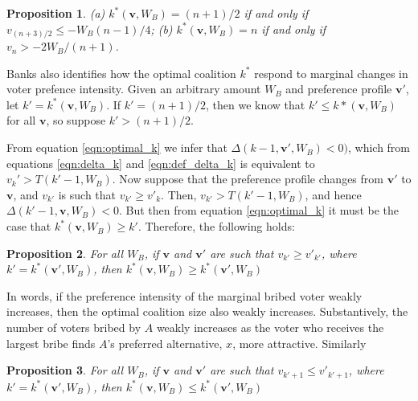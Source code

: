 \documentclass[12pt,a4paper]{article}
\newtheorem{proposition}{Proposition}
\begin{document}
\begin{proposition}
    (a) $k^*(\mathbf{v}, W_B) = (n + 1)/2$ if and only if $v_{(n + 3)/2} \leq -W_B(n - 1)/4$; (b) $k^*(\mathbf{v}, W_B) = n$ if and only if $v_n > -2W_B/(n + 1)$.
\end{proposition}

Banks also identifies how the optimal coalition $k^*$ respond to marginal changes in voter prefence intensity. Given an arbitrary amount $W_B$ and preference profile $\mathbf{v}'$, let $k' = k^*(\mathbf{v}, W_B)$. If $k' = (n + 1)/2$, then we know that $k' \leq k*(\mathbf{v}, W_B)$ for all $\mathbf{v}$, so suppose $k' > (n + 1)/2$.

From equation \ref{eqn:optimal_k} we infer that $\Delta(k - 1, \mathbf{v}', W_B) < 0)$, which from equations \ref{eqn:delta_k} and \ref{eqn:def_delta_k} is equivalent to $v_k' > T(k' - 1, W_B)$. Now suppose that the preference profile changes from $\mathbf{v}'$ to $\mathbf{v}$, and $v_{k'}$ is such that $v_{k'} \geq v'_k$. Then, $v_{k'} > T(k' - 1, W_B)$, and hence $\Delta(k' - 1, \mathbf{v}, W_B) < 0$. But then from equation \ref{eqn:optimal_k} it must be the case that $k^*(\mathbf{v}, W_B) \geq k'$. Therefore, the following holds:

\begin{proposition}
    For all $W_B$, if $\mathbf{v}$ and $\mathbf{v}'$ are such that $v_{k'} \geq v'_{k'}$, where $k' = k^*(\mathbf{v}', W_B)$, then $k^*(\mathbf{v}, W_B) \geq k^*(\mathbf{v}', W_B)$
\end{proposition}

In words, if the preference intensity of the marginal bribed voter weakly increases, then the optimal coalition size also weakly increases. Substantively, the number of voters bribed by $A$ weakly increases as the voter who receives the largest bribe finds $A$'s preferred alternative, $x$, more attractive. Similarly

\begin{proposition}
    For all $W_B$, if $\mathbf{v}$ and $\mathbf{v}'$ are such that $v_{k' + 1} \leq v'_{k' + 1}$, where $k' = k^*(\mathbf{v}', W_B)$, then $k^*(\mathbf{v}, W_B) \leq k^*(\mathbf{v}', W_B)$
\end{proposition}
\end{document}
